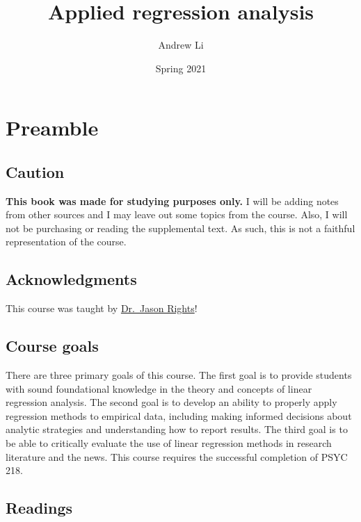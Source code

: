 \documentclass[
]{book}
\title{Applied regression analysis}
\author{Andrew Li}
\date{Spring 2021}
\begin{document}
\maketitle

{
\setcounter{tocdepth}{1}
\tableofcontents
}
\hypertarget{preamble}{%
\chapter{Preamble}\label{preamble}}

\hypertarget{caution}{%
\section{Caution}\label{caution}}

\textbf{This book was made for studying purposes only.} I will be adding notes from other sources and I may leave out some topics from the course. Also, I will not be purchasing or reading the supplemental text. As such, this is not a faithful representation of the course.

\hypertarget{acknowledgments}{%
\section{Acknowledgments}\label{acknowledgments}}

This course was taught by \href{https://psych.ubc.ca/profile/jason-rights/}{Dr.~Jason Rights}!

\hypertarget{course-goals}{%
\section{Course goals}\label{course-goals}}

There are three primary goals of this course. The first goal is to provide students with sound foundational knowledge in the theory and concepts of linear regression analysis. The second goal is to develop an ability to properly apply regression methods to empirical data, including making informed decisions about analytic strategies and understanding how to report results. The third goal is to be able to critically evaluate the use of linear regression methods in research literature and the news. This course requires the successful completion of PSYC 218.

\hypertarget{readings}{%
\section{Readings}\label{readings}}
\end{document}
